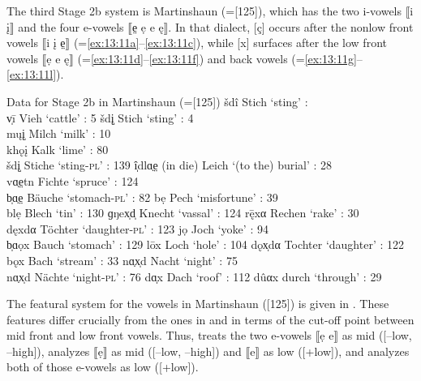 The third Stage 2b system is Martinshaun (=[125]), which has the two i-vowels ⟦i \k{i}⟧ and the four e-vowels ⟦e̤ ẹ e ę⟧. In that dialect, [ç] occurs after the nonlow front vowels ⟦i \k{i} e̤⟧ (=\ref{ex:13:11a}--\ref{ex:13:11c}), while [x] surfaces after the low front vowels ⟦ẹ e ę⟧ (=\ref{ex:13:11d}--\ref{ex:13:11f}) and back vowels (=\ref{ex:13:11g}--\ref{ex:13:11l}).

\ea%
\label{ex:13:11}Data for Stage 2b in Martinshaun (=[125])
\ea\label{ex:13:11a} šdî \tab Stich \tab ‘sting’ :\\
    v̩ī \tab Vieh \tab ‘cattle’ : 5
\ex\label{ex:13:11b} šd\k{i}̩ \tab Stich \tab ‘sting’ : 4\\
    m\k{u}\k{i}̩ \tab Milch \tab ‘milk’ : 10\\
    khǫ\k{i} \tab Kalk \tab  ‘lime’ : 80\\
    šd\k{i}̩ \tab Stiche \tab ‘sting-\textsc{pl}’ : 139
\ex\label{ex:13:11c} î̩dlɑ̣e̤ \tab (in die) Leich \tab ‘(to the) burial’ : 28\\
    vɑ̣e̤tn \tab Fichte \tab ‘spruce’ : 124\\
    b̩ɑ̣e̤ \tab Bäuche \tab ‘stomach-\textsc{pl}' : 82
\ex\label{ex:13:11d} bẹ \tab Pech \tab ‘misfortune’ : 39\\
    blẹ \tab Blech \tab ‘tin’ : 130
\ex\label{ex:13:11e} ɡŋex̩d̩ \tab Knecht \tab ‘vassal’ : 124
\ex\label{ex:13:11f} r\={ę}xα \tab Rechen \tab ‘rake’ : 30\\
    dęxdα \tab Töchter \tab ‘daughter-\textsc{pl}’ : 123
\ex\label{ex:13:11g} jọ \tab Joch \tab ‘yoke’ : 94\\
    b̩ɑọx \tab Bauch \tab ‘stomach’ : 129
\ex\label{ex:13:11h} lōx \tab Loch \tab ‘hole’ : 104
\ex\label{ex:13:11i} dǫx̩dα \tab Tochter \tab ‘daughter’ : 122\\
    bǫx \tab Bach \tab ‘stream’ : 33
\ex\label{ex:13:11j} nɑ̣x̩d \tab Nacht \tab ‘night’ : 75\\
    nɑ̣x̩d \tab Nächte \tab ‘night-\textsc{pl}’ : 76
\ex\label{ex:13:11k} dɑ̩x \tab Dach \tab ‘roof’ : 112
\ex\label{ex:13:11l} dûαx \tab durch  \tab  ‘through’ : 29
\z
\z 

The featural system for the vowels in Martinshaun ([125]) is given in . These features differ crucially from the ones in  and  in terms of the cut-off point between mid front and low front vowels. Thus,  treats the two e-vowels ⟦ẹ e⟧ as mid ([{}--low, --high]),  analyzes ⟦ẹ⟧ as mid      ([--low, --high]) and ⟦e⟧ as low ([+low]), and  analyzes both of those e-vowels as low ([+low]).

